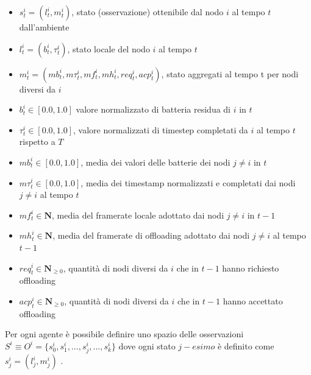 \documentclass{article}
\begin{document}
\begin{itemize}
    \item $s_t^i = (l_t^i, m_t^i)$, stato (osservazione) ottenibile dal nodo $i$ al tempo $t$ dall'ambiente
    \item $l_t^i = (b_t^i, \tau_t^i)$, stato locale del nodo $i$ al tempo $t$ 
    \item $m_t^i = (mb_t^i, m\tau_t^i, mf_t^i, mh_t^i, req_t^i, acp_t^i)$, stato aggregati al tempo t per nodi diversi da $i$
    
    \item $b_t^i \in [0.0, 1.0]$ valore normalizzato di batteria residua di $i$ in $t$
    \item $\tau_t^i \in [0.0, 1.0]$, valore normalizzati di timestep completati da $i$ al tempo $t$ rispetto a $T$
    
    \item $mb_t^i \in [0.0, 1.0]$, media dei valori delle batterie dei nodi $j \neq i$ in $t$
    \item $m\tau_t^i \in [0.0, 1.0]$, media dei timestamp normalizzati e completati dai nodi $j \neq i$ al tempo $t$
    \item $mf_t^i \in \mathbf{N}$, media del framerate locale adottato dai nodi $j \neq i$ in $t-1$
    \item $mh_t^i \in \mathbf{N}$, media del framerate di offloading adottato dai nodi $j \neq i$ al tempo $t-1$
    \item $req_t^i \in \mathbf{N}_{\geq0}$, quantità di nodi diversi da $i$ che in $t-1$ hanno richiesto offloading 
    \item $acp_t^i \in \mathbf{N}_{\geq0}$, quantità di nodi diversi da $i$ che in $t-1$ hanno accettato offloading 
\end{itemize}

\noindent Per ogni agente è possibile definire uno spazio delle osservazioni $S^i \equiv O^i = \{s_0^i, s_1^i, ..., s_j^i, ..., s_k^i\}$ dove ogni stato $j-esimo$ è definito come $s_j^i = (l_j^i, m_j^i)$ .\\
\end{document}
